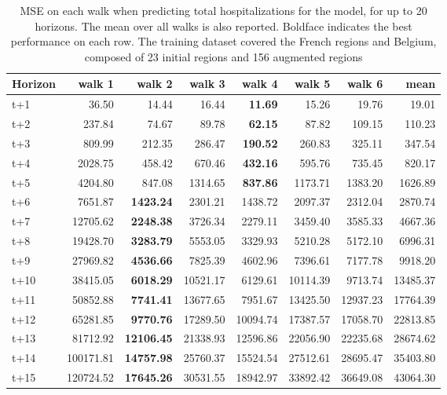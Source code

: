\begin{table}[H]
\centering
\caption{MSE on each walk when predicting total hospitalizations for the model, for up to 20 horizons. The mean over all walks is also reported. Boldface indicates the best performance on each row. The training dataset covered the French regions and Belgium, composed of 23 initial regions and 156 augmented regions }
\label{tab:MSE_walk_custom_linear_regression}
\begin{tabular}{lrrrrrrr}
\toprule
Horizon &    walk 1 &   walk 2 &   walk 3 &   walk 4 &   walk 5 &    walk 6 &     mean \\
\midrule
t+1  & 36.50  & 14.44  & 16.44  & \textbf{11.69}  & 15.26  & 19.76  & 19.01  \\
t+2  & 237.84  & 74.67  & 89.78  & \textbf{62.15}  & 87.82  & 109.15  & 110.23  \\
t+3  & 809.99  & 212.35  & 286.47  & \textbf{190.52}  & 260.83  & 325.11  & 347.54  \\
t+4  & 2028.75  & 458.42  & 670.46  & \textbf{432.16}  & 595.76  & 735.45  & 820.17  \\
t+5  & 4204.80  & 847.08  & 1314.65  & \textbf{837.86}  & 1173.71  & 1383.20  & 1626.89  \\
t+6  & 7651.87  & \textbf{1423.24}  & 2301.21  & 1438.72  & 2097.37  & 2312.04  & 2870.74  \\
t+7  & 12705.62  & \textbf{2248.38}  & 3726.34  & 2279.11  & 3459.40  & 3585.33  & 4667.36  \\
t+8  & 19428.70  & \textbf{3283.79}  & 5553.05  & 3329.93  & 5210.28  & 5172.10  & 6996.31  \\
t+9  & 27969.82  & \textbf{4536.66}  & 7825.39  & 4602.96  & 7396.61  & 7177.78  & 9918.20  \\
t+10  & 38415.05  & \textbf{6018.29}  & 10521.17  & 6129.61  & 10114.39  & 9713.74  & 13485.37  \\
t+11  & 50852.88  & \textbf{7741.41}  & 13677.65  & 7951.67  & 13425.50  & 12937.23  & 17764.39  \\
t+12  & 65281.85  & \textbf{9770.76}  & 17289.50  & 10094.74  & 17387.57  & 17058.70  & 22813.85  \\
t+13  & 81712.92  & \textbf{12106.45}  & 21338.93  & 12596.86  & 22056.90  & 22235.68  & 28674.62  \\
t+14  & 100171.81  & \textbf{14757.98}  & 25760.37  & 15524.54  & 27512.61  & 28695.47  & 35403.80  \\
t+15  & 120724.52  & \textbf{17645.26}  & 30531.55  & 18942.97  & 33892.42  & 36649.08  & 43064.30  \\

\end{tabular}
\end{table}
